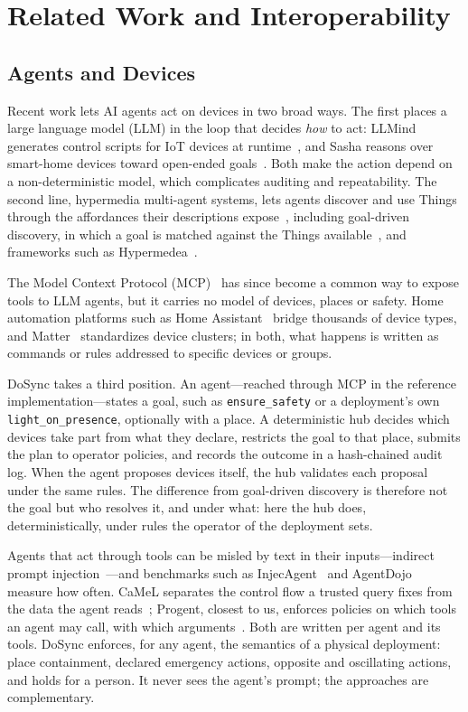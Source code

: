 \documentclass[conference]{IEEEtran}
\newcommand{\code}[1]{\texttt{#1}}
\begin{document}
\section{Related Work and Interoperability}
\label{sec:related}

\subsection{Agents and Devices}
Recent work lets AI agents act on devices in two broad ways. The first places a large language model (LLM) in the loop that decides \emph{how} to act: LLMind generates control scripts for IoT devices at runtime~\cite{llmind}, and Sasha reasons over smart-home devices toward open-ended goals~\cite{sasha}. Both make the action depend on a non-deterministic model, which complicates auditing and repeatability. The second line, hypermedia multi-agent systems, lets agents discover and use Things through the affordances their descriptions expose~\cite{ciortea-emas,ciortea-decade}, including goal-driven discovery, in which a goal is matched against the Things available~\cite{ciortea-goal}, and frameworks such as Hypermedea~\cite{hypermedea}.

The Model Context Protocol (MCP)~\cite{mcp} has since become a common way to expose tools to LLM agents, but it carries no model of devices, places or safety. Home automation platforms such as Home Assistant~\cite{homeassistant} bridge thousands of device types, and Matter~\cite{matter} standardizes device clusters; in both, what happens is written as commands or rules addressed to specific devices or groups.

DoSync takes a third position. An agent---reached through MCP in the reference implementation---states a goal, such as \code{ensure\_safety} or a deployment's own \code{light\_on\_presence}, optionally with a place. A deterministic hub decides which devices take part from what they declare, restricts the goal to that place, submits the plan to operator policies, and records the outcome in a hash-chained audit log. When the agent proposes devices itself, the hub validates each proposal under the same rules. The difference from goal-driven discovery is therefore not the goal but who resolves it, and under what: here the hub does, deterministically, under rules the operator of the deployment sets.

Agents that act through tools can be misled by text in their inputs---indirect prompt injection~\cite{greshake}---and benchmarks such as InjecAgent~\cite{injecagent} and AgentDojo~\cite{agentdojo} measure how often. CaMeL separates the control flow a trusted query fixes from the data the agent reads~\cite{camel}; Progent, closest to us, enforces policies on which tools an agent may call, with which arguments~\cite{progent}. Both are written per agent and its tools. DoSync enforces, for any agent, the semantics of a physical deployment: place containment, declared emergency actions, opposite and oscillating actions, and holds for a person. It never sees the agent's prompt; the approaches are complementary.
\end{document}
